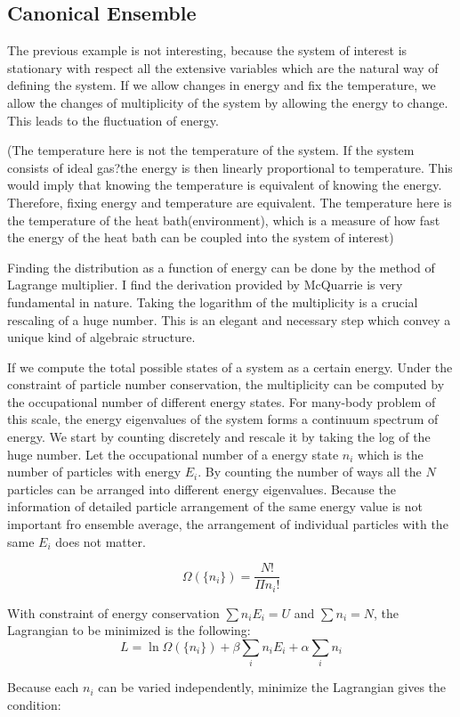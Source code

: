 \documentclass[12pt, oneside]{article}   	%
\begin{document}
\subsection{Canonical Ensemble}
The previous example is not interesting, because the system of interest is stationary with respect all the extensive variables which are the natural way of defining the system. If we allow changes in energy and fix the temperature, we allow the changes of multiplicity of the system by allowing the energy to change. This leads to the fluctuation of energy. 
\par 
(The temperature here is not the temperature of the system. If the system consists of ideal gas?the energy is then linearly proportional to temperature. This would imply that knowing the temperature is equivalent of knowing the energy. Therefore, fixing energy and temperature are equivalent. The temperature here is the temperature of the heat bath(environment), which is a measure of how fast the energy of the heat bath can be coupled into the system of interest) 
\par 
Finding the distribution as a function of energy can be done by the method of Lagrange multiplier. I find the derivation provided by McQuarrie is very fundamental in nature. Taking the logarithm of the multiplicity is a crucial rescaling of a huge number. This is an elegant and necessary step which convey a unique kind of algebraic structure. 
\par
If we compute the total possible states of a system as a certain energy. Under the constraint of particle number conservation, the multiplicity can be computed by the occupational number of different energy states. For many-body problem of this scale, the energy eigenvalues of the system forms a continuum spectrum of energy. We start by counting discretely and rescale it by taking the log of the huge number. Let the occupational number of a energy state $n_i$ which is the number of particles with energy $E_i$. By counting the number of ways all the $N$ particles can be arranged into different energy eigenvalues. Because the information of detailed particle arrangement of the same energy value is not important fro ensemble average, the arrangement of individual particles with the same $E_i$ does not matter. 

$$\Omega(\{n_i\}) = \frac{N!}{\Pi n_i!}$$

With constraint of energy conservation $\sum n_i E_i = U$ and $\sum n_i = N$, the Lagrangian to be minimized is the following: 
$$L = \ln \Omega(\{n_i\}) + \beta \sum_i n_i E_i + \alpha \sum_i n_i
$$
\par 
Because each $n_i$ can be varied independently, minimize the Lagrangian gives the condition: 
\end{document}
